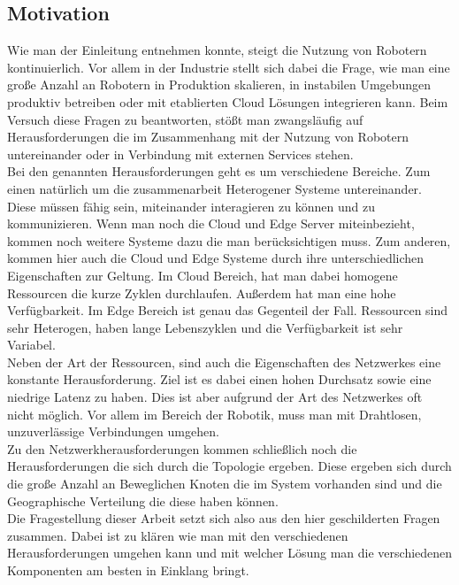 \subsection{Motivation}

Wie man der Einleitung entnehmen konnte, steigt die Nutzung von Robotern kontinuierlich. Vor allem in der Industrie stellt sich dabei die Frage, wie man eine große Anzahl an Robotern in Produktion skalieren, in instabilen Umgebungen produktiv betreiben oder mit etablierten Cloud Lösungen integrieren kann. Beim Versuch diese Fragen zu beantworten, stößt man zwangsläufig auf Herausforderungen die im Zusammenhang mit der Nutzung von Robotern untereinander oder in Verbindung mit externen Services stehen.\\
Bei den genannten Herausforderungen geht es um verschiedene Bereiche. Zum einen natürlich um die zusammenarbeit Heterogener Systeme untereinander. Diese müssen fähig sein, miteinander interagieren zu können und zu kommunizieren. Wenn man noch die Cloud und Edge Server miteinbezieht, kommen noch weitere Systeme dazu die man berücksichtigen muss. Zum anderen, kommen hier auch die Cloud und Edge Systeme durch ihre unterschiedlichen Eigenschaften zur Geltung. Im Cloud Bereich, hat man dabei homogene Ressourcen die kurze Zyklen durchlaufen. Außerdem hat man eine hohe Verfügbarkeit. Im Edge Bereich ist genau das Gegenteil der Fall. Ressourcen sind sehr Heterogen, haben lange Lebenszyklen und die Verfügbarkeit ist sehr Variabel.\\
Neben der Art der Ressourcen, sind auch die Eigenschaften des Netzwerkes eine konstante Herausforderung. Ziel ist es dabei einen hohen Durchsatz sowie eine niedrige Latenz zu haben. Dies ist aber aufgrund der Art des Netzwerkes oft nicht möglich. Vor allem im Bereich der Robotik, muss man mit Drahtlosen, unzuverlässige Verbindungen umgehen.\\
Zu den Netzwerkherausforderungen kommen schließlich noch die Herausforderungen die sich durch die Topologie ergeben. Diese ergeben sich durch die große Anzahl an Beweglichen Knoten die im System vorhanden sind und die Geographische Verteilung die diese haben können.\\
Die Fragestellung dieser Arbeit setzt sich also aus den hier geschilderten Fragen zusammen. Dabei ist zu klären wie man mit den verschiedenen Herausforderungen umgehen kann und mit welcher Lösung man die verschiedenen Komponenten am besten in Einklang bringt.\\
